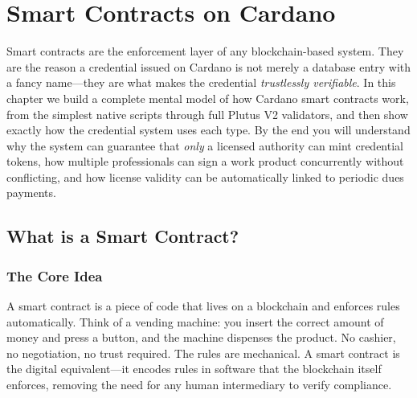 
\chapter{Smart Contracts on Cardano}
\label{ch:smart-contracts}


Smart contracts are the enforcement layer of any blockchain-based system.
They are the reason a credential issued on Cardano is not merely a
database entry with a fancy name---they are what makes the credential
\emph{trustlessly verifiable}. In this chapter we build a complete
mental model of how Cardano smart contracts work, from the simplest
native scripts through full Plutus V2 validators, and then show exactly
how the credential system uses each type. By the end you will understand
why the system can guarantee that \emph{only} a licensed authority can
mint credential tokens, how multiple professionals can sign a work
product concurrently without conflicting, and how license validity can
be automatically linked to periodic dues payments.


\section{What is a Smart Contract?}
\label{sec:what-is-smart-contract}

\subsection{The Core Idea}

A smart contract is a piece of code that lives on a blockchain and
enforces rules automatically. Think of a vending machine: you insert
the correct amount of money and press a button, and the machine
dispenses the product. No cashier, no negotiation, no trust required.
The rules are mechanical. A smart contract is the digital equivalent---it
encodes rules in software that the blockchain itself enforces, removing
the need for any human intermediary to verify compliance.

